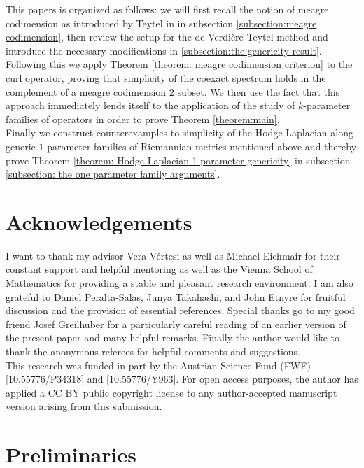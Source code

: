 This papers is organized as follows: we will first recall the notion of meagre codimension as introduced by Teytel in \cite{Teytel1999} in subsection \ref{subsection:meagre codimension}, then review the setup for the de Verdière-Teytel method and introduce the necessary modifications in \ref{subsection:the genericity result}. Following this we apply Theorem \ref{theorem: meagre codimension criterion} to the curl operator, proving that simplicity of the coexact spectrum holds in the complement of a meagre codimension $2$ subset. We then use the fact that this approach immediately lends itself to the application of the study of $k$-parameter families of operators in order to prove Theorem \ref{theorem:main}.\\
Finally we construct counterexamples to simplicity of the Hodge Laplacian along generic $1$-parameter families of Riemannian metrics mentioned above and thereby prove Theorem \ref{theorem: Hodge Laplacian 1-parameter genericity} in subsection \ref{subsection: the one parameter family arguments}.







\section*{Acknowledgements}
I want to thank my advisor Vera V\'ertesi as well as Michael Eichmair for their constant support and helpful mentoring as well as the Vienna School of Mathematics for providing a stable and pleasant research environment. I am also grateful to Daniel Peralta-Salas, Junya Takahashi, and John Etnyre for fruitful discussion and the provision of essential references. Special thanks go to my good friend Josef Greilhuber for a particularly careful reading of an earlier version of the present paper and many helpful remarks. Finally the author would like to thank the anonymous referees for helpful comments and suggestions.\\
This research was funded in part by the Austrian Science Fund (FWF) [10.55776/P34318] and [10.55776/Y963]. For open access purposes, the author has applied a CC BY public copyright license to any author-accepted manuscript version arising from this submission.




\section{Preliminaries}
\label{section:Preliminaries}

